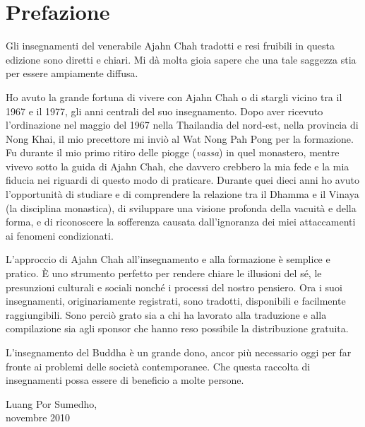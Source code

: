 \chapter{Prefazione}

Gli insegnamenti del venerabile Ajahn Chah tradotti e resi fruibili in
questa edizione sono diretti e chiari. Mi dà molta gioia sapere che una
tale saggezza stia per essere ampiamente diffusa.

Ho avuto la grande fortuna di vivere con Ajahn Chah o di stargli vicino
tra il 1967 e il 1977, gli anni centrali del suo insegnamento. Dopo aver
ricevuto l'ordinazione nel maggio del 1967 nella Thailandia del
nord-est, nella provincia di Nong Khai, il mio precettore mi inviò al
Wat Nong Pah Pong per la formazione. Fu durante il mio primo ritiro
delle piogge (\emph{vassa}) in quel monastero, mentre vivevo sotto la
guida di Ajahn Chah, che davvero crebbero la mia fede e la mia fiducia
nei riguardi di questo modo di praticare. Durante quei dieci anni ho
avuto l'opportunità di studiare e di comprendere la relazione tra il
Dhamma e il Vinaya (la disciplina monastica), di sviluppare una visione
profonda della vacuità e della forma, e di riconoscere la sofferenza
causata dall'ignoranza dei miei attaccamenti ai fenomeni condizionati.

L'approccio di Ajahn Chah all'insegnamento e alla formazione è semplice
e pratico. È uno strumento perfetto per rendere chiare le illusioni del
sé, le presunzioni culturali e sociali nonché i processi del nostro
pensiero. Ora i suoi insegnamenti, originariamente registrati, sono
tradotti, disponibili e facilmente raggiungibili. Sono perciò grato sia
a chi ha lavorato alla traduzione e alla compilazione sia agli sponsor
che hanno reso possibile la distribuzione gratuita.

L'insegnamento del Buddha è un grande dono, ancor più necessario oggi
per far fronte ai problemi delle società contemporanee. Che questa
raccolta di insegnamenti possa essere di beneficio a molte persone.

\bigskip

{\raggedleft
  Luang Por Sumedho,\\
  novembre 2010
\par}

